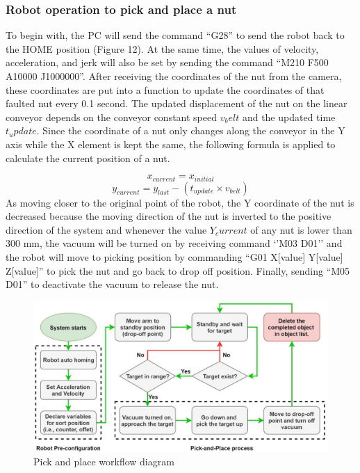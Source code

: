 \documentclass[10pt, letterpaper]{article}
\begin{document}
\subsubsection*{Robot operation to pick and place a nut}
    To begin with, the PC will send the command “G28” to send the robot back to the HOME position (Figure 12). At the same time, the values of velocity, acceleration, and jerk will also be set by sending the command “M210 F500 A10000 J1000000”.  After receiving the coordinates of the nut from the camera, these coordinates are put into a function to update the coordinates of that faulted nut every 0.1 second. The updated displacement of the nut on the linear conveyor depends on the conveyor constant speed \(v_belt\) and the updated time \(t_update\). Since the coordinate of a nut only changes along the conveyor in the Y axis while the X element is kept the same, the following formula is applied to calculate the current position of a nut.\par
    \begin{equation} \label{eq10} x_{current} = x_{initial} \end{equation}
    \begin{equation} \label{eq11} y_{current} = y_{last} - (t_{update} \times v_{belt}) \end{equation}
    As moving closer to the original point of the robot, the Y coordinate of the nut is decreased because the moving direction of the nut is inverted to the positive direction of the system and whenever the value \(Y_current\) of any nut is lower than 300 mm, the vacuum will be turned on by receiving command ‘’M03 D01’’ and the robot will move to picking position by commanding “G01 X[value] Y[value] Z[value]” to pick the nut and go back to drop off position. Finally, sending “M05 D01” to deactivate the vacuum to release the nut.\par
    \begin{figure}[h]
        \centering
        \includegraphics[width=\textwidth]{fig11.JPG}
        \caption{Pick and place workflow diagram}
    \end{figure}
\end{document}
